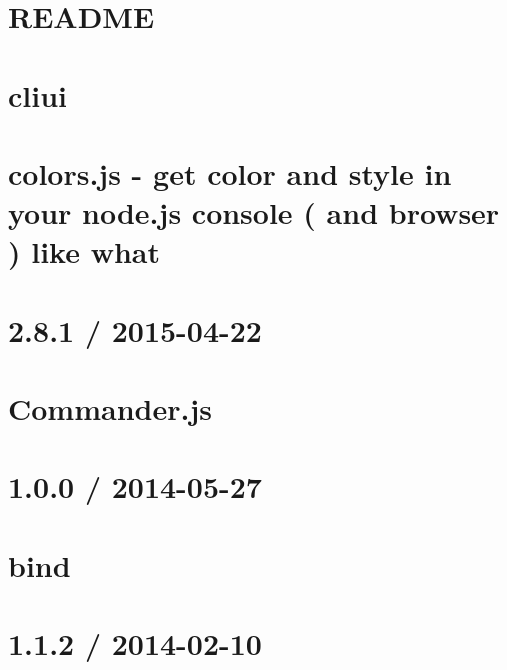 \documentclass[twoside]{book}
\newcommand{\+}{\discretionary{\mbox{\scriptsize$\hookleftarrow$}}{}{}}
\begin{document}
\chapter{R\+E\+A\+D\+ME}
\label{md_app_web_node_modules_clean-css__r_e_a_d_m_e}

\chapter{cliui}
\label{md_app_web_node_modules_cliui__r_e_a_d_m_e}

\chapter{colors.\+js -\/ get color and style in your node.\+js console ( and browser ) like what}
\label{md_app_web_node_modules_colors__read_me}

\chapter{2.8.1 / 2015-\/04-\/22}
\label{md_app_web_node_modules_commander__history}

\chapter{Commander.\+js}
\label{md_app_web_node_modules_commander__readme}

\chapter{1.0.0 / 2014-\/05-\/27}
\label{md_app_web_node_modules_component-bind__history}

\chapter{bind}
\label{md_app_web_node_modules_component-bind__readme}

\chapter{1.1.2 / 2014-\/02-\/10}
\label{md_app_web_node_modules_component-emitter__history}

\end{document}
